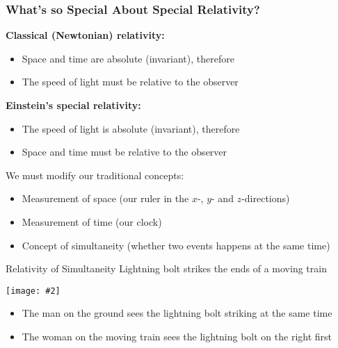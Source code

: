 \documentclass[12pt,compress,aspectratio=169]{beamer}
\newcommand{\pic}[2]{\texttt{[image: \#2]}}
\begin{document}
\begin{frame}
  \frametitle{What's so Special About Special Relativity?}

  \textbf{Classical (Newtonian) relativity:}
  \begin{itemize}
  \item Space and time are absolute (invariant), therefore
  \item The speed of light must be relative to the observer
  \end{itemize}

  \textbf{Einstein's special relativity:}
  \begin{itemize}
  \item The speed of light is absolute (invariant), therefore
  \item Space and time must be relative to the observer
  \end{itemize}

  We must modify our traditional concepts:
  \begin{itemize}
  \item Measurement of space (our ruler in the $x$-, $y$- and $z$-directions)
  \item Measurement of time (our clock)
  \item Concept of simultaneity (whether two events happens at the same time)
  \end{itemize}
\end{frame}


\begin{frame}{Relativity of Simultaneity}
  Lightning bolt strikes the ends of a moving train
  \begin{center}
    \pic{.5}{graphics/87-1-1024x673.png}
  \end{center}
  \vspace{-0.1in}
  \begin{itemize}
  \item The man on the ground sees the lightning bolt striking at the same time
  \item The woman on the moving train sees the lightning bolt on the right first
  \end{itemize}
\end{frame}
\end{document}
